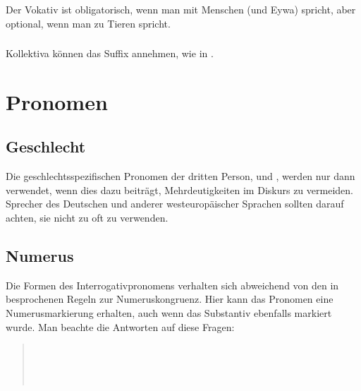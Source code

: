\subsubsection{}
Der Vokativ ist obligatorisch, wenn man mit Menschen (und Eywa) spricht, aber optional, wenn man zu Tieren spricht.

\subsubsection{} Kollektiva können das Suffix  annehmen, wie in  .


\section{Pronomen}


\subsection{Geschlecht} Die geschlechtsspezifischen Pronomen der dritten Person,  und , werden nur dann verwendet, wenn dies dazu beiträgt, Mehrdeutigkeiten im Diskurs zu vermeiden. Sprecher des Deutschen und anderer westeuropäischer Sprachen sollten darauf achten, sie nicht zu oft zu verwenden. \label{syn:pron:gender}

\subsection{Numerus} Die Formen des Interrogativpronomens  verhalten sich abweichend von den in  besprochenen Regeln zur Numeruskongruenz. \label{syn:pron:q-number} Hier kann das Pronomen eine Numerusmarkierung erhalten, auch wenn das Substantiv ebenfalls markiert wurde. Man beachte die Antworten auf diese Fragen:

\begin{quotation}
	\noindent{} \\
	\noindent{} \\
	
	\noindent{} \\
	\noindent{} 
\end{quotation}

